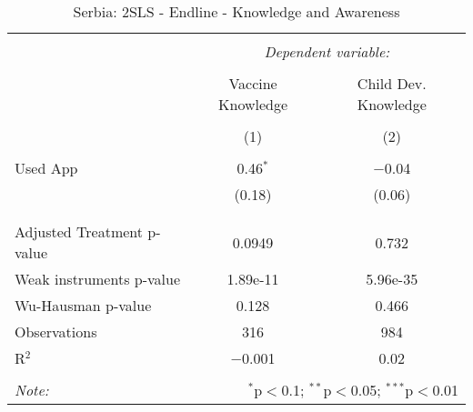 
\begin{table}[!htbp] \centering 
  \caption{Serbia: 2SLS - Endline - Knowledge and Awareness} 
  \label{tbl:Serbia: 2SLS - Endline - Knowledge and Awareness} 
\begin{tabular}{@{\extracolsep{5pt}}lcc} 
\\[-1.8ex]\hline 
\hline \\[-1.8ex] 
 & \multicolumn{2}{c}{\textit{Dependent variable:}} \\ 
\cline{2-3} 
\\[-1.8ex] & Vaccine Knowledge & Child Dev. Knowledge \\ 
\\[-1.8ex] & (1) & (2)\\ 
\hline \\[-1.8ex] 
 Used App & 0.46$^{*}$ & $-$0.04 \\ 
  & (0.18) & (0.06) \\ 
  & & \\ 
\hline \\[-1.8ex] 
Adjusted Treatment p-value & 0.0949 & 0.732 \\ 
Weak instruments p-value & 1.89e-11 & 5.96e-35 \\ 
Wu-Hausman p-value & 0.128 & 0.466 \\ 
Observations & 316 & 984 \\ 
R$^{2}$ & $-$0.001 & 0.02 \\ 
\hline 
\hline \\[-1.8ex] 
\textit{Note:}  & \multicolumn{2}{r}{$^{*}$p$<$0.1; $^{**}$p$<$0.05; $^{***}$p$<$0.01} \\ 
\end{tabular} 
\end{table} 
